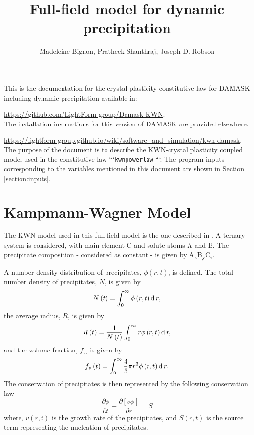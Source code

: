 \documentclass[11pt]{scrartcl}
\newcommand{\inc}[1]{\ensuremath{\text d\,{#1}}}
\newcommand{\partialder}[2]{\ensuremath{\frac{\partial{#1}}{\partial{#2}}}}
\begin{document}
\author{Madeleine Bignon, Pratheek Shanthraj, Joseph D. Robson}
\title{Full-field model for dynamic precipitation}
\maketitle

\noindent This is the documentation for the crystal plasticity constitutive law for DAMASK including dynamic precipitation available in:
 
\noindent  \url{https://github.com/LightForm-group/Damask-KWN}.  \\
 
\noindent The installation instructions for this version of DAMASK are provided elsewhere:
 
  \noindent  \url{https://lightform-group.github.io/wiki/software_and_simulation/kwn-damask}.\\


\noindent The purpose of the document is to describe the KWN-crystal plasticity coupled model used in the constitutive law ```\texttt{kwnpowerlaw} ```.  The program inputs corresponding to the variables mentioned in this document are shown in Section \ref{section:inputs}.

\section{Kampmann-Wagner Model}

The KWN model used in this full field model is the one described in \cite{Bignon2022}. A ternary system is considered, with main element C and solute atoms A and B. The precipitate composition - considered as constant - is given by \hypertarget{stoichiometry} {A\textsubscript{x}B\textsubscript{y}C\textsubscript{z}}.

A number density distribution of precipitates, $\phi\left(r,t\right)$, is defined. 
The total number density of precipitates, $N$, is given by
%
\begin{equation}
\label{eq: totaldensity}
N\left(t\right) = \int_{0}^{\infty} \phi\left(r,t\right) \inc{r},
\end{equation}
%
the average radius, $R$, is given by
%
\begin{equation}
\label{eq: avgradius}
R\left(t\right) = \frac{1}{N\left(t\right)}\int_{0}^{\infty} r \phi\left(r,t\right) \inc{r},
\end{equation}
%
and the volume fraction, $f_{v}$, is given by
%
\begin{equation}
\label{eq: volfrac}
f_{v}\left(t\right) =\int_{0}^{\infty} \frac{4}{3} \pi r^3 \phi\left(r,t\right) \inc{r}.
\end{equation}
%
The conservation of precipitates is then represented by the following conservation law
%
\begin{equation}
\label{eq: conservation}
\partialder{\phi}{t}+ \partialder{\left[v \phi\right]}{r} = S
\end{equation}
%
where, $v\left(r,t\right)$ is the growth rate of the precipitates, and $S\left(r,t\right)$ is the source term representing the nucleation of precipitates.
\end{document}
